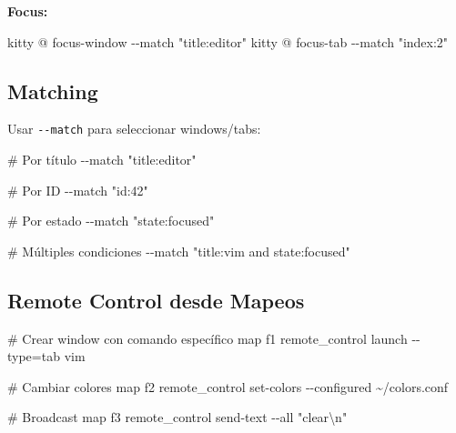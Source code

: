 \documentclass[
  doc,
  floatsintext,
  longtable,
  a4paper,
  nolmodern,
  notxfonts,
  notimes,
  12pt,
  colorlinks=true,linkcolor=blue,citecolor=blue,urlcolor=blue]{apa7}
\newenvironment{Shaded}{\begin{snugshade}}{\end{snugshade}}
\newcommand{\AttributeTok}[1]{\textcolor[rgb]{0.40,0.45,0.13}{#1}}
\newcommand{\CommentTok}[1]{\textcolor[rgb]{0.37,0.37,0.37}{#1}}
\newcommand{\DataTypeTok}[1]{\textcolor[rgb]{0.68,0.00,0.00}{#1}}
\newcommand{\ErrorTok}[1]{\textcolor[rgb]{0.68,0.00,0.00}{#1}}
\newcommand{\ExtensionTok}[1]{\textcolor[rgb]{0.00,0.23,0.31}{#1}}
\newcommand{\NormalTok}[1]{\textcolor[rgb]{0.00,0.23,0.31}{#1}}
\newcommand{\OperatorTok}[1]{\textcolor[rgb]{0.37,0.37,0.37}{#1}}
\newcommand{\SpecialCharTok}[1]{\textcolor[rgb]{0.37,0.37,0.37}{#1}}
\newcommand{\StringTok}[1]{\textcolor[rgb]{0.13,0.47,0.30}{#1}}
\begin{document}
\textbf{Focus:}

\begin{Shaded}
\begin{Highlighting}[]
\ExtensionTok{kitty}\NormalTok{ @ focus{-}window }\AttributeTok{{-}{-}match} \StringTok{"title:editor"}
\ExtensionTok{kitty}\NormalTok{ @ focus{-}tab }\AttributeTok{{-}{-}match} \StringTok{"index:2"}
\end{Highlighting}
\end{Shaded}

\subsection{Matching}\label{matching}

Usar \texttt{-\/-match} para seleccionar windows/tabs:

\begin{Shaded}
\begin{Highlighting}[]
\CommentTok{\# Por título}
\ExtensionTok{{-}{-}match} \StringTok{"title:editor"}

\CommentTok{\# Por ID}
\ExtensionTok{{-}{-}match} \StringTok{"id:42"}

\CommentTok{\# Por estado}
\ExtensionTok{{-}{-}match} \StringTok{"state:focused"}

\CommentTok{\# Múltiples condiciones}
\ExtensionTok{{-}{-}match} \StringTok{"title:vim and state:focused"}
\end{Highlighting}
\end{Shaded}

\subsection{Remote Control desde
Mapeos}\label{remote-control-desde-mapeos}

\begin{Shaded}
\begin{Highlighting}[]
\CommentTok{\# Crear window con comando específico}
\DataTypeTok{map} \DataTypeTok{f1} \DataTypeTok{remote\_control} \DataTypeTok{launch} \DataTypeTok{{-}{-}type}\OperatorTok{=}\DataTypeTok{tab} \DataTypeTok{vim}

\CommentTok{\# Cambiar colores}
\DataTypeTok{map} \DataTypeTok{f2} \DataTypeTok{remote\_control} \DataTypeTok{set{-}colors} \DataTypeTok{{-}{-}configured} \ErrorTok{\textasciitilde{}/}\DataTypeTok{colors.conf}

\CommentTok{\# Broadcast}
\DataTypeTok{map} \DataTypeTok{f3} \DataTypeTok{remote\_control} \DataTypeTok{send{-}text} \DataTypeTok{{-}{-}all} \DataTypeTok{"clear}\SpecialCharTok{\textbackslash{}n}\DataTypeTok{"}
\end{Highlighting}
\end{Shaded}
\end{document}
